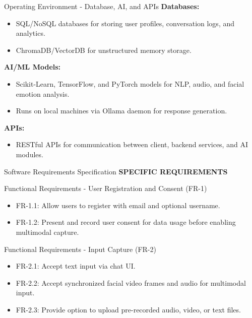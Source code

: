 \documentclass{beamer}
\begin{document}
\begin{frame}{Operating Environment - Database, AI, and APIs}
\textbf{Databases:}
\begin{itemize}
    \item SQL/NoSQL databases for storing user profiles, conversation logs, and analytics.
    \item ChromaDB/VectorDB for unstructured memory storage.
\end{itemize}

\textbf{AI/ML Models:}
\begin{itemize}
    \item Scikit-Learn, TensorFlow, and PyTorch models for NLP, audio, and facial emotion analysis.
    \item Runs on local machines via Ollama daemon for response generation.
\end{itemize}

\textbf{APIs:}
\begin{itemize}
    \item RESTful APIs for communication between client, backend services, and AI modules.
\end{itemize}
\end{frame}



\begin{frame}{Software Requirements Specification}
    \justifying
    \centering
    \huge \textbf{SPECIFIC REQUIREMENTS}
\end{frame}

\begin{frame}{Functional Requirements - User Registration and Consent (FR-1)}
\begin{itemize}
    \item FR-1.1: Allow users to register with email and optional username.
    \item FR-1.2: Present and record user consent for data usage before enabling multimodal capture.
\end{itemize}
\end{frame}

\begin{frame}{Functional Requirements - Input Capture (FR-2)}
\begin{itemize}
    \item FR-2.1: Accept text input via chat UI.
    \item FR-2.2: Accept synchronized facial video frames and audio for multimodal input.
    \item FR-2.3: Provide option to upload pre-recorded audio, video, or text files.
\end{itemize}
\end{frame}
\end{document}
